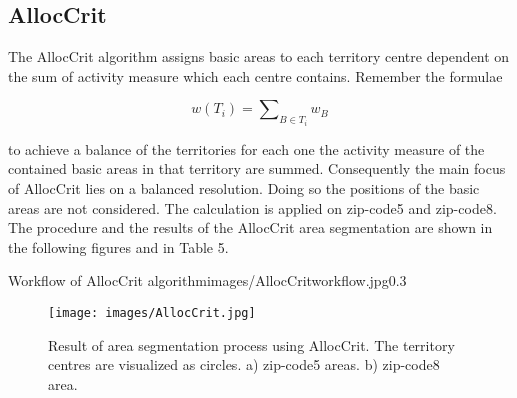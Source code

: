 \subsection{AllocCrit}
The AllocCrit algorithm assigns basic areas to each territory centre dependent on the sum of activity measure which each centre contains. Remember the formulae

\[ \mathit{w(T_{i}) = \sum\nolimits  _{B \in T_{i}} w_{B}}\]

to achieve a balance of the territories for each one the activity measure of the contained basic areas in that territory are summed. Consequently the main focus of AllocCrit lies on a balanced resolution. Doing so the positions of the basic areas are not considered. The calculation is applied on zip-code5 and zip-code8. The procedure and the results of the AllocCrit area segmentation are shown in the following figures and in Table 5.

\begin{figurevarSize}{Workflow of AllocCrit algorithm}{images/AllocCritworkflow.jpg}{0.3}\end{figurevarSize}

\begin{figure}[H]
	\centering
	\texttt{[image: images/AllocCrit.jpg]}
	\caption[Result of area segmentation process using AllocCrit.]{Result of area segmentation process using AllocCrit. The territory centres are visualized as circles. a) zip-code5 areas. b) zip-code8 area.}
\end{figure}  


